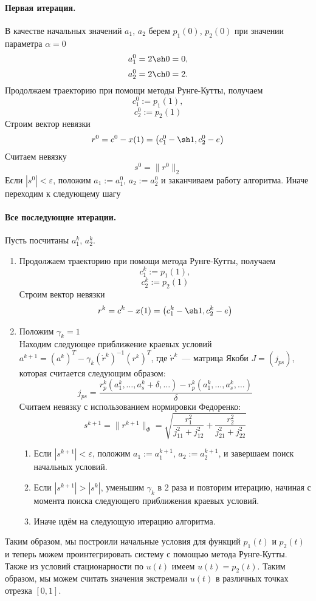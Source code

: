 \documentclass[24pt]{article}
\begin{document}
\paragraph{Первая итерация.}

В качестве начальных значений $a_1$, $a_2$ берем $p_1(0)$, $p_2(0)$ при значении параметра $\alpha = 0$
$$ a_1^0 = 2\sh 0 = 0,$$ $$a_2^0 = 2\ch 0 = 2.$$
Продолжаем траекторию при помощи методы Рунге-Кутты, получаем
$$c_1^0 := p_1(1),$$ $$c_2^0 := p_2(1)$$
Строим вектор невязки
$$r^0 = c^0 - x(1) = \left(c_1^0 - \sh 1, c_2^0 - e\right)$$
Считаем невязку
$$s^0 = \|r^0\|_2$$
Если $\left|s^0\right| < \varepsilon$, положим $a_1 := a_1^0$, $a_2 := a_2^0$ и заканчиваем работу алгоритма. Иначе переходим к следующему шагу
\paragraph{Все последующие итерации.}
Пусть посчитаны $a_1^k$, $a_2^k$.
\begin{enumerate}
\item
Продолжаем траекторию при помощи метода Рунге-Кутты, получаем
$$c_1^k := p_1(1),$$ $$c_2^k := p_2(1)$$
Строим вектор невязки
$$r^k = c^k - x(1) = \left(c_1^k - \sh 1, c_2^k - e\right)$$
\item
Положим $\gamma_k = 1$\\
Находим следующее приближение краевых условий
$a^{k+1} = \left(a^k\right)^T - \gamma_k\left(\dot r^k\right)^{-1}\left(r^k\right)^T$, где
$\dot r^k$~--- матрица Якоби $J = \left(j_{ps}\right)$, которая считается следующим образом:
$$j_{ps} = \frac{r^k_p\left(a^k_1,\ldots,a_s^k + \delta, \ldots\right) - r^k_p\left(a^k_1,\ldots,a_s^k, \ldots\right)}{\delta}$$
Считаем невязку с использованием нормировки Федоренко:
$$s^{k+1} = \|r^{k+1}\|_\Phi = \sqrt{\frac{r_1^2}{j_{11}^2+j_{12}^2} + \frac{r_2^2}{j_{21}^2+j_{22}^2} }$$
\begin{enumerate}
\item
Если $\left|s^{k+1}\right| < \varepsilon$, положим $a_1 := a_1^{k+1}$, $a_2 := a_2^{k+1}$, и завершаем поиск начальных условий.
\item
Если $\left|s^{k+1}\right| > \left|s^{k}\right|$, уменьшим $\gamma_k$ в 2 раза и повторим итерацию, начиная с момента поиска следующего приближения краевых условий. 
\item
Иначе идём на следующую итерацию алгоритма.
\end{enumerate}
\end{enumerate}
Таким образом, мы построили начальные условия для функций $p_1(t)$ и $p_2(t)$ и теперь можем проинтегрировать систему с помощью метода Рунге-Кутты.\\
Также из условий стационарности по $u(t)$ имеем $u(t) = p_2(t)$. Таким образом, мы можем считать значения экстремали $u(t)$ в различных точках отрезка $[0,1]$.
\end{document}
